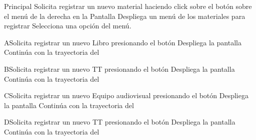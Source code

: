 \begin{UCtrayectoria}{Principal}
		\UCpaso[\UCactor] Solicita registrar un nuevo material haciendo click sobre el botón  sobre el menú de la derecha en la Pantalla 
		\UCpaso[\UCsist] Despliega un menú de los materiales para registrar
		\UCpaso[\UCactor] Selecciona una opción del menú.    
\end{UCtrayectoria}


\begin{UCtrayectoriaA}{A}{Solicita registrar un nuevo Libro presionando el botón }	
		\UCpaso[\UCsist] Despliega la pantalla  
		\UCpaso[\UCsist] Continúa con la trayectoria del 
		\end{UCtrayectoriaA}

\begin{UCtrayectoriaA}{B}{Solicita registrar un nuevo TT presionando el botón }	
		\UCpaso[\UCsist] Despliega la pantalla  
		\UCpaso[\UCsist] Continúa con la trayectoria del 
\end{UCtrayectoriaA}


\begin{UCtrayectoriaA}{C}{Solicita registrar un nuevo Equipo audiovisual presionando el botón }	
		\UCpaso[\UCsist] Despliega la pantalla  
		\UCpaso[\UCsist] Continúa con la trayectoria del 
\end{UCtrayectoriaA}


\begin{UCtrayectoriaA}{D}{Solicita registrar un nuevo TT presionando el botón }	
		\UCpaso[\UCsist] Despliega la pantalla  
		\UCpaso[\UCsist] Continúa con la trayectoria del 
\end{UCtrayectoriaA}

